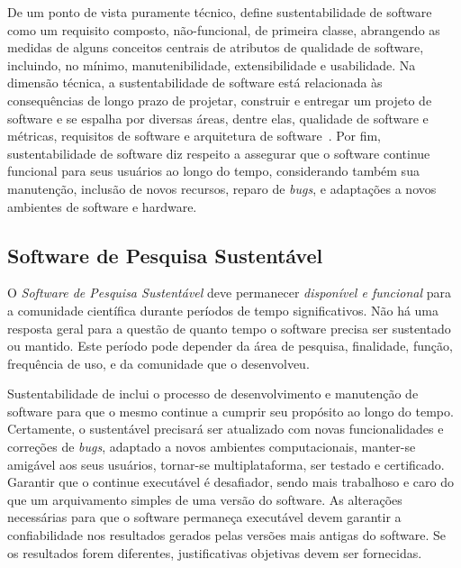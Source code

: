 De um ponto de vista puramente técnico, \cite{venters_software_2021} define sustentabilidade de software como um requisito composto, não-funcional, de primeira classe, abrangendo as medidas de alguns conceitos centrais de atributos de qualidade de software, incluindo, no mínimo, manutenibilidade, extensibilidade e usabilidade.
Na dimensão técnica, a sustentabilidade de software está relacionada às consequências de longo prazo de projetar, construir e entregar um projeto de software e se espalha por diversas áreas, dentre elas, qualidade de software e métricas, requisitos de software e arquitetura de software~\cite{DBLP:conf/re/KehrerP18,venters_software_2021}.
Por fim, sustentabilidade de software diz respeito a assegurar que o software continue funcional para seus usuários ao longo do tempo, considerando também sua manutenção, inclusão de novos recursos, reparo de \textit{bugs}, e adaptações a novos ambientes de software e hardware.



\subsection*{Software de Pesquisa Sustentável}

O \textit{Software de Pesquisa Sustentável} deve permanecer \textit{disponível e funcional} para a comunidade científica durante períodos de tempo significativos. 
Não há uma resposta geral para a questão de quanto tempo o software precisa ser sustentado ou mantido. Este período pode depender da área de pesquisa, finalidade, função, frequência de uso, e da comunidade que o desenvolveu.

Sustentabilidade de \RSw inclui o processo de desenvolvimento e manutenção de software para que o mesmo continue a cumprir seu propósito ao longo do tempo. 
%
Certamente, o \RSw sustentável precisará ser atualizado com novas funcionalidades e correções de \textit{bugs}, adaptado a novos ambientes computacionais, manter-se amigável aos seus usuários, tornar-se multiplataforma, ser testado e certificado.
Garantir que o \RSw continue executável é desafiador, sendo  mais trabalhoso e caro do que um arquivamento simples de uma versão do software.  
As alterações necessárias para que o software permaneça executável devem garantir a confiabilidade nos resultados gerados pelas versões mais antigas do software. 
Se os resultados forem diferentes, justificativas objetivas devem ser fornecidas. 

